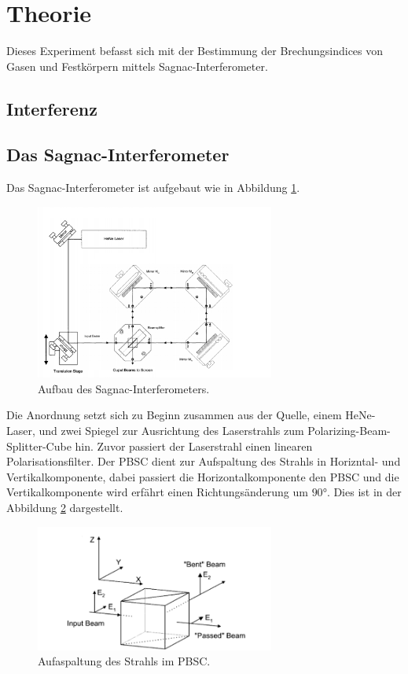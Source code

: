 \section{Theorie}
\label{sec:Theorie}
Dieses Experiment befasst sich mit der Bestimmung der Brechungsindices
von Gasen und Festkörpern mittels Sagnac-Interferometer.

\subsection{Interferenz}
\subsection{Das Sagnac-Interferometer}
Das Sagnac-Interferometer ist aufgebaut wie in Abbildung \ref{fig:apparat}.
\begin{figure}
    \centering
    \includegraphics[width=0.7\textwidth]{Apparatur.PNG}
    \caption{Aufbau des Sagnac-Interferometers.\cite{skript}}
    \label{fig:apparat}
\end{figure}
Die Anordnung setzt sich zu Beginn zusammen aus der Quelle, einem HeNe-Laser, und zwei
Spiegel zur Ausrichtung des Laserstrahls zum Polarizing-Beam-Splitter-Cube hin.
Zuvor passiert der Laserstrahl einen linearen Polarisationsfilter.
Der PBSC dient zur Aufspaltung des Strahls in Horizntal- und Vertikalkomponente,
dabei passiert die Horizontalkomponente den PBSC und die Vertikalkomponente wird
erfährt einen Richtungsänderung um $90\si{\degree}$. Dies ist in der Abbildung
\ref{fig:pbsc} dargestellt.
\begin{figure}
   \centering
   \includegraphics[width=0.7\textwidth]{Pbsc.PNG}
   \caption{Aufaspaltung des Strahls im PBSC.\cite{skript}}
   \label{fig:pbsc}
\end{figure}\\
